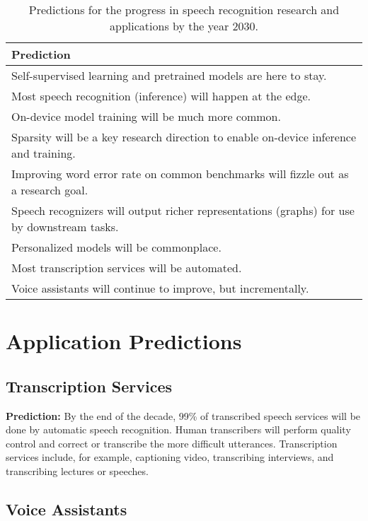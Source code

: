 \begin{table*}[ht!]
    \caption{Predictions for the progress in speech recognition research and applications
    by the year 2030.}
    \centering
    \begin{tabular}{l}
    \toprule
    Prediction \\
    \midrule
    Self-supervised learning and pretrained models are here to stay. \\
    \rowcolor{Gray} Most speech recognition (inference) will happen at the edge. \\
    On-device model training will be much more common. \\
    \rowcolor{Gray} Sparsity will be a key research direction to enable on-device inference and training. \\
    Improving word error rate on common benchmarks will fizzle out as a research goal. \\
    \rowcolor{Gray} Speech recognizers will output richer representations (graphs) for use by downstream tasks. \\
    Personalized models will be commonplace. \\
    \rowcolor{Gray} Most transcription services will be automated. \\
    Voice assistants will continue to improve, but incrementally. \\
    \bottomrule
    \end{tabular}
    \label{tab:predictions}
\end{table*}

\section{Application Predictions}
\label{sec:application_predictions}

\subsection{Transcription Services}

{\bf Prediction:} By the end of the decade, 99\% of transcribed speech services
will be done by automatic speech recognition. Human transcribers will perform
quality control and correct or transcribe the more difficult utterances.
Transcription services include, for example, captioning video, transcribing
interviews, and transcribing lectures or speeches.

\subsection{Voice Assistants}

